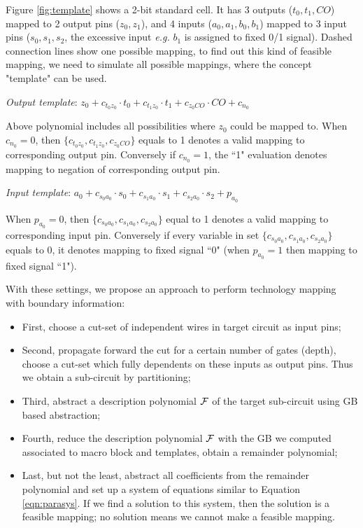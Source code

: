 Figure \ref{fig:template} shows a 2-bit standard cell. It has 3 outputs ($t_0,t_1,CO$) mapped to 2 output pins ($z_0,z_1$),
and 4 inputs ($a_0,a_1,b_0,b_1$) mapped to 3 input pins ($s_0,s_1,s_2$, the excessive input {\it e.g.} $b_1$ is assigned to fixed 0/1 signal). Dashed connection
lines show one possible mapping, to find out this kind of feasible mapping, we need to simulate
all possible mappings, where the concept "template" can be used.

{\it Output template}: $z_0+c_{{t_0}{z_0}}\cdot t_0+c_{t_1z_0}\cdot t_1+c_{z_0CO}\cdot CO+c_{n_0}$

Above polynomial includes all possibilities where $z_0$ could be mapped to.
When $c_{n_0} = 0$, then $\{c_{t_0z_0},c_{t_1z_0},c_{z_0CO}\}$ equals to 1 denotes a valid mapping to corresponding output pin. 
Conversely if $c_{n_0} = 1$, the ``1" evaluation denotes mapping to negation of corresponding output pin.

{\it Input template}: $a_0+c_{s_0a_0}\cdot s_0+c_{s_1a_0}\cdot s_1+c_{s_2a_0}\cdot s_2+p_{a_0}$

When $p_{a_0} = 0$, then $\{c_{s_0a_0},c_{s_1a_0},c_{s_2a_0}\}$ equal to 1 denotes a valid mapping to corresponding input
pin. Conversely if every variable in set $\{c_{s_0a_0},c_{s_1a_0},c_{s_2a_0}\}$ equals to 0, 
it denotes mapping to fixed signal ``0" (when $p_{a_0} = 1$ then
mapping to fixed signal ``1").

With these settings, we propose an approach to perform technology mapping with boundary information:
\begin{itemize}
\item First, choose a cut-set of independent wires in target circuit as input pins;

\item Second, propagate forward the cut for a certain number of gates (depth), choose a cut-set
which fully dependents on these inputs as output pins. Thus we obtain a sub-circuit by partitioning;

\item Third, abstract a description polynomial ${\mathcal{F}}$ of the target sub-circuit using GB based abstraction;

\item Fourth, reduce the description polynomial ${\mathcal{F}}$ with the GB we computed associated to macro block 
and templates, obtain a remainder polynomial;

\item Last, but not the least, abstract all coefficients from the remainder polynomial and set up 
a system of equations similar to Equation \ref{eqn:parasys}.
If we find a solution to this system, then the solution is a feasible mapping; no solution means we cannot make a
feasible mapping.
\end{itemize}
